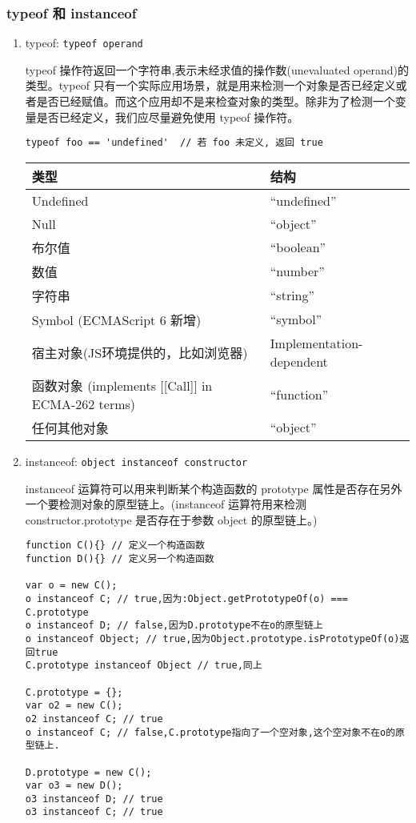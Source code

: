 \subsubsection{typeof 和 instanceof}\label{typeof-ux548c-instanceof}

\begin{enumerate}
\def\labelenumi{\arabic{enumi}.}
\item
  typeof: \lstinline!typeof operand!

  typeof 操作符返回一个字符串,表示未经求值的操作数(unevaluated
  operand)的类型。typeof
  只有一个实际应用场景，就是用来检测一个对象是否已经定义或者是否已经赋值。而这个应用却不是来检查对象的类型。除非为了检测一个变量是否已经定义，我们应尽量避免使用
  typeof 操作符。

\begin{lstlisting}
typeof foo == 'undefined'  // 若 foo 未定义, 返回 true
\end{lstlisting}

  \begin{longtable}[]{@{}ll@{}}
  \toprule
  类型 & 结构\tabularnewline
  \midrule
  \endhead
  Undefined & ``undefined''\tabularnewline
  Null & ``object''\tabularnewline
  布尔值 & ``boolean''\tabularnewline
  数值 & ``number''\tabularnewline
  字符串 & ``string''\tabularnewline
  Symbol (ECMAScript 6 新增) & ``symbol''\tabularnewline
  宿主对象(JS环境提供的，比如浏览器) &
  Implementation-dependent\tabularnewline
  函数对象 (implements {[}{[}Call{]}{]} in ECMA-262 terms) &
  ``function''\tabularnewline
  任何其他对象 & ``object''\tabularnewline
  \bottomrule
  \end{longtable}
\item
  instanceof: \lstinline!object instanceof constructor!

  instanceof 运算符可以用来判断某个构造函数的 prototype
  属性是否存在另外一个要检测对象的原型链上。(instanceof 运算符用来检测
  constructor.prototype 是否存在于参数 object 的原型链上。)

\begin{lstlisting}
function C(){} // 定义一个构造函数
function D(){} // 定义另一个构造函数

var o = new C();
o instanceof C; // true,因为:Object.getPrototypeOf(o) === C.prototype
o instanceof D; // false,因为D.prototype不在o的原型链上
o instanceof Object; // true,因为Object.prototype.isPrototypeOf(o)返回true
C.prototype instanceof Object // true,同上

C.prototype = {};
var o2 = new C();
o2 instanceof C; // true
o instanceof C; // false,C.prototype指向了一个空对象,这个空对象不在o的原型链上.

D.prototype = new C();
var o3 = new D();
o3 instanceof D; // true
o3 instanceof C; // true
\end{lstlisting}
\end{enumerate}

